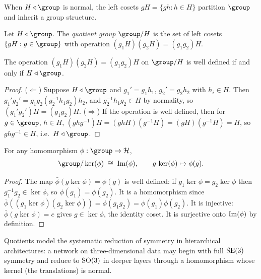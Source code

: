 When $H \triangleleft \group$ is normal, the left cosets $gH = \{gh : h \in H\}$
partition $\group$ and inherit a group structure.

\begin{definition}
\label{def:found:quotient}
Let $H \triangleleft \group$. The \emph{quotient group} $\group/H$ is the set of
left cosets $\{gH : g \in \group\}$ with operation
$(g_1 H)(g_2 H) = (g_1 g_2) H$.
\end{definition}

\begin{proposition}
\label{prop:found:quotient-welldef}
The operation $(g_1 H)(g_2 H) = (g_1 g_2)H$ on $\group/H$ is well defined if and
only if $H \triangleleft \group$.
\end{proposition}

\begin{proof}
($\Leftarrow$) Suppose $H \triangleleft \group$ and $g_1' = g_1 h_1$,
$g_2' = g_2 h_2$ with $h_i \in H$. Then $g_1'g_2' = g_1 g_2 (g_2^{-1}h_1 g_2)h_2$,
and $g_2^{-1}h_1 g_2 \in H$ by normality, so $(g_1'g_2')H = (g_1 g_2)H$.
($\Rightarrow$) If the operation is well defined, then for $g \in \group$,
$h \in H$, $(ghg^{-1})H = (ghH)(g^{-1}H) = (gH)(g^{-1}H) = H$, so $ghg^{-1} \in H$,
i.e.\ $H \triangleleft \group$.
\end{proof}

\begin{theorem}
\label{thm:found:first-iso}
For any homomorphism $\phi : \group \to \mathcal{H}$,
\[
  \group / \ker(\phi) \;\cong\; \Img(\phi), \qquad
  g\,\ker(\phi) \mapsto \phi(g).
\]
\end{theorem}

\begin{proof}
The map $\bar\phi(g\ker\phi) = \phi(g)$ is well defined: if $g_1\ker\phi =
g_2\ker\phi$ then $g_1^{-1}g_2 \in \ker\phi$, so $\phi(g_1) = \phi(g_2)$. It is a
homomorphism since $\bar\phi((g_1\ker\phi)(g_2\ker\phi)) = \phi(g_1 g_2) =
\phi(g_1)\phi(g_2)$. It is injective: $\bar\phi(g\ker\phi) = e$ gives
$g \in \ker\phi$, the identity coset. It is surjective onto $\operatorname{Im}(\phi)$ by
definition.
\end{proof}

Quotients model the systematic reduction of symmetry in hierarchical
architectures: a network on three-dimensional data may begin with full $\operatorname{SE}(3)$
symmetry and reduce to $\operatorname{SO}(3)$ in deeper layers through a homomorphism whose
kernel (the translations) is normal.


